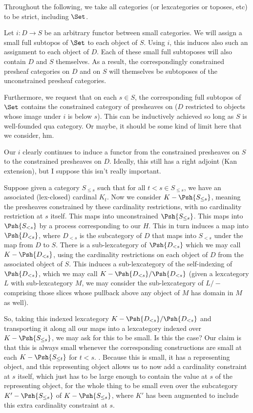 \begin{construction}
Throughout the following, we take all categories (or lexcategories or toposes, etc) to be strict, including $\Set$.

Let $i : D \to S$ be an arbitrary functor between small categories. We will assign a small full subtopos of $\Set$ to each object of $S$. Using $i$, this induces also such an assignment to each object of $D$. Each of these small full subtoposes will also contain $D$ and $S$ themselves. As a result, the correspondingly constrained presheaf categories on $D$ and on $S$ will themselves be subtoposes of the unconstrained presheaf categories.

Furthermore, we request that on each $s \in S$, the corresponding full subtopos of $\Set$ contains the constrained category of presheaves on ($D$ restricted to objects whose image under $i$ is below $s$). This can be inductively achieved so long as $S$ is well-founded qua category. Or maybe, it should be some kind of limit here that we consider, hm.

Our $i$ clearly continues to induce a functor from the constrained presheaves on $S$ to the constrained presheaves on $D$. Ideally, this still has a right adjoint (Kan extension), but I suppose this isn't really important.


\end{construction}

Suppose given a category $S_{\leq s}$ such that for all $t < s \in S_{\leq s}$, we have an associated (lex-closed) cardinal $K_t$. Now we consider $K-\Psh{S_{\leq s}}$, meaning the presheaves constrained by these cardinality restrictions, with no cardinality restriction at $s$ itself. This maps into unconstrained $\Psh{S_{\leq s}}$. This maps into $\Psh{S_{< s}}$ by a process corresponding to our $H$. This in turn induces a map into $\Psh{D_{< s}}$, where $D_{< s}$ is the subcategory of $D$ that maps into $S_{< s}$ under the map from $D$ to $S$. There is a sub-lexcategory of $\Psh{D_{< s}}$ which we may call $K-\Psh{D_{< s}}$, using the cardinality restrictions on each object of $D$ from the associated object of $S$. This induces a sub-lexcategory of the self-indexing of $\Psh{D_{< s}}$, which we may call $K-\Psh{D_{< s}}/\Psh{D_{< s}}$ (given a lexcategory $L$ with sub-lexcategory $M$, we may consider the sub-lexcategory of $L/-$ comprising those slices whose pullback above any object of $M$ has domain in $M$ as well). 

So, taking this indexed lexcategory $K-\Psh{D_{< s}}/\Psh{D_{< s}}$ and transporting it along all our maps into a lexcategory indexed over $K-\Psh{S_{\leq s}}$, we may ask for this to be small. Is this the case? Our claim is that this is always small whenever the corresponding constructions are small at each $K-\Psh{S_{\leq t}}$ for $t < s$. \TODO. Because this is small, it has a representing object, and this representing object allows us to now add a cardinality constraint at $s$ itself, which just has to be large enough to contain the value at $s$ of the representing object, for the whole thing to be small even over the subcategory $K'-\Psh{S_{\leq s}}$ of $K-\Psh{S_{\leq s}}$, where $K'$ has been augmented to include this extra cardinality constraint at $s$.

